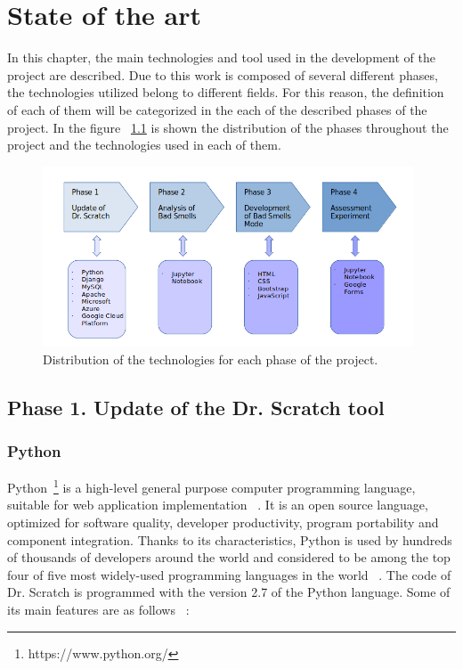 

\chapter{State of the art}
\label{chap:state}

In this chapter, the main technologies and tool used in the development of the project are described. Due to this work is composed of several different phases, the technologies utilized belong to different fields. For this reason, the definition of each of them will be categorized in the each of the described phases of the project. In the figure ~\ref{fig:phasesdistribution} is shown the distribution of the phases throughout the project and the technologies used in each of them. 

 \begin{figure}
    \centering
    \includegraphics[width=11cm,                         keepaspectratio]{img/phases_state_art.png}
    \caption{Distribution of the technologies for each phase of the project.}
    \label{fig:phasesdistribution}
\end{figure}

\section{Phase 1. Update of the Dr. Scratch tool}
\label{sec:phase_1}

\subsection{Python} 
\label{subsec:python}

Python~\footnote{https://www.python.org/} is a high-level general purpose computer programming language, suitable for web application implementation ~\cite{kuhlman:python}. It is an open source language, optimized for software quality, developer productivity, program portability and component integration. Thanks to its characteristics, Python is used by hundreds of thousands of developers around the world and considered to be among the top four of five most widely-used programming languages in the world ~\cite{lutz:programming}. The code of Dr. Scratch is programmed with the version 2.7 of the Python language. Some of its main features are as follows ~\cite{javatpoint:_python}:

